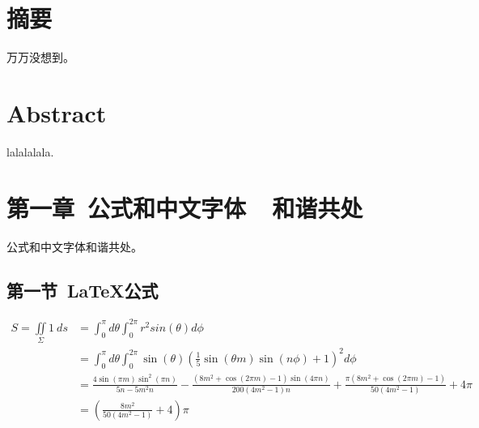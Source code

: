 \documentclass{ctexart}
\newcommand{\xiaosi}{\fontsize{12pt}{0}}
\begin{document}


\renewcommand{\headrulewidth}{0pt}%
\clearpage
{} %

\xiaosi
\section*{摘要}
万万没想到。

\section*{Abstract}
lalalalala.


\clearpage
\tableofcontents
\clearpage



\renewcommand{\headrulewidth}{0.4pt} %


\setcounter{page}{1} 


\section{第一章\ 公式和中文字体\ \ 和谐共处}

公式和中文字体和谐共处。\\

\subsection{第一节\ LaTeX公式}

\begin{align*}
S=\iint\limits_{\Sigma}1 \ ds &= \int_0^{\pi}d\theta \int_0^{2\pi} r^2sin(\theta) d\phi \\
&= \int_0^{\pi}d\theta \int_0^{2\pi}\sin (\theta ) \left(\frac{1}{5} \sin (\theta  m) \sin (n \phi )+1\right)^2d\phi\\
&=\frac{4 \sin (\pi  m) \sin ^2(\pi  n)}{5 n-5 m^2 n}-\frac{\left(8 m^2+\cos (2 \pi  m)-1\right) \sin (4 \pi  n)}{200 \left(4 m^2-1\right) n}+\frac{\pi  \left(8 m^2+\cos (2 \pi  m)-1\right)}{50 \left(4 m^2-1\right)}+4 \pi\\
&=  \left(\frac{8 m^2}{50 \left(4 m^2-1\right)}+4\right)\pi
\end{align*}
\end{document}

